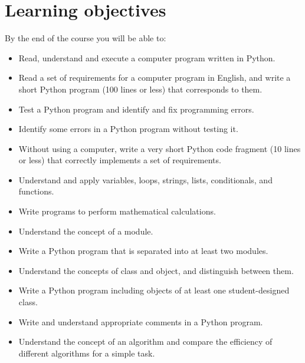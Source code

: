 \documentclass{article}
\begin{document}
\section*{Learning objectives}

By the end of the course you will be able to:

\begin{itemize}
\item Read, understand and execute a computer program written in Python.
\item Read a set of requirements for a computer program in English, and
    write a short Python program (100 lines or less) that corresponds to
    them.
\item Test a Python program and identify and fix programming errors.
\item Identify some errors in a Python program without testing it.
\item Without using a computer, write a very short Python code fragment
    (10 lines or less) that correctly implements a set of requirements.
\item Understand and apply variables, loops, strings, lists, conditionals,
    and functions.
\item Write programs to perform mathematical calculations.
\item Understand the concept of a module.
\item Write a Python program that is separated into at least two modules.
\item Understand the concepts of class and object, and distinguish between
    them.
\item Write a Python program including objects of at least one
    student-designed class.
\item Write and understand appropriate comments in a Python program.
\item Understand the concept of an algorithm and compare the efficiency of
    different algorithms for a simple task.
\end{itemize}
\end{document}
